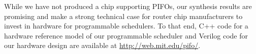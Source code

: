 While we have not produced a chip supporting PIFOs, our synthesis results
are promising and make a strong technical case for router chip manufacturers to invest
in hardware for programmable schedulers. To that end, C++ code for a
hardware reference model of our programmable scheduler and Verilog
code for our hardware design are available at \url{http://web.mit.edu/pifo/}.
